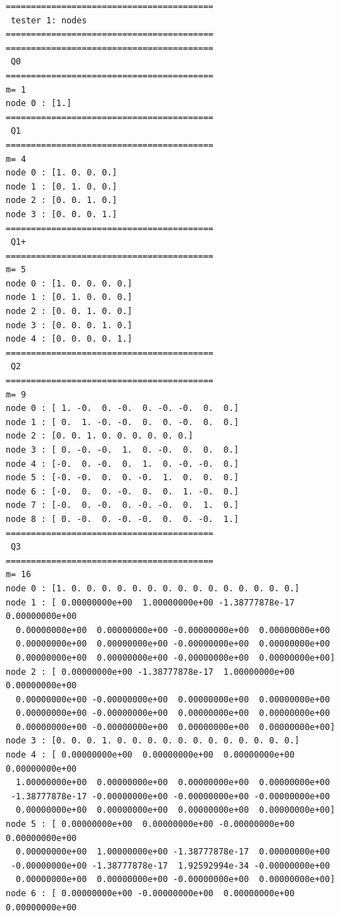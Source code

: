 \begin{scriptsize}
\begin{verbatim}
=========================================
 tester 1: nodes
=========================================
=========================================
 Q0
=========================================
m= 1
node 0 : [1.]
=========================================
 Q1
=========================================
m= 4
node 0 : [1. 0. 0. 0.]
node 1 : [0. 1. 0. 0.]
node 2 : [0. 0. 1. 0.]
node 3 : [0. 0. 0. 1.]
=========================================
 Q1+
=========================================
m= 5
node 0 : [1. 0. 0. 0. 0.]
node 1 : [0. 1. 0. 0. 0.]
node 2 : [0. 0. 1. 0. 0.]
node 3 : [0. 0. 0. 1. 0.]
node 4 : [0. 0. 0. 0. 1.]
=========================================
 Q2
=========================================
m= 9
node 0 : [ 1. -0.  0. -0.  0. -0. -0.  0.  0.]
node 1 : [ 0.  1. -0. -0.  0.  0. -0.  0.  0.]
node 2 : [0. 0. 1. 0. 0. 0. 0. 0. 0.]
node 3 : [ 0. -0. -0.  1.  0. -0.  0.  0.  0.]
node 4 : [-0.  0. -0.  0.  1.  0. -0. -0.  0.]
node 5 : [-0. -0.  0.  0. -0.  1.  0.  0.  0.]
node 6 : [-0.  0.  0. -0.  0.  0.  1. -0.  0.]
node 7 : [-0.  0. -0.  0. -0. -0.  0.  1.  0.]
node 8 : [ 0. -0.  0. -0. -0.  0.  0. -0.  1.]
=========================================
 Q3
=========================================
m= 16
node 0 : [1. 0. 0. 0. 0. 0. 0. 0. 0. 0. 0. 0. 0. 0. 0. 0.]
node 1 : [ 0.00000000e+00  1.00000000e+00 -1.38777878e-17  0.00000000e+00
  0.00000000e+00  0.00000000e+00 -0.00000000e+00  0.00000000e+00
  0.00000000e+00  0.00000000e+00 -0.00000000e+00  0.00000000e+00
  0.00000000e+00  0.00000000e+00 -0.00000000e+00  0.00000000e+00]
node 2 : [ 0.00000000e+00 -1.38777878e-17  1.00000000e+00  0.00000000e+00
  0.00000000e+00 -0.00000000e+00  0.00000000e+00  0.00000000e+00
  0.00000000e+00 -0.00000000e+00  0.00000000e+00  0.00000000e+00
  0.00000000e+00 -0.00000000e+00  0.00000000e+00  0.00000000e+00]
node 3 : [0. 0. 0. 1. 0. 0. 0. 0. 0. 0. 0. 0. 0. 0. 0. 0.]
node 4 : [ 0.00000000e+00  0.00000000e+00  0.00000000e+00  0.00000000e+00
  1.00000000e+00  0.00000000e+00  0.00000000e+00  0.00000000e+00
 -1.38777878e-17 -0.00000000e+00 -0.00000000e+00 -0.00000000e+00
  0.00000000e+00  0.00000000e+00  0.00000000e+00  0.00000000e+00]
node 5 : [ 0.00000000e+00  0.00000000e+00 -0.00000000e+00  0.00000000e+00
  0.00000000e+00  1.00000000e+00 -1.38777878e-17  0.00000000e+00
 -0.00000000e+00 -1.38777878e-17  1.92592994e-34 -0.00000000e+00
  0.00000000e+00  0.00000000e+00 -0.00000000e+00  0.00000000e+00]
node 6 : [ 0.00000000e+00 -0.00000000e+00  0.00000000e+00  0.00000000e+00

\end{verbatim}
\end{scriptsize}
